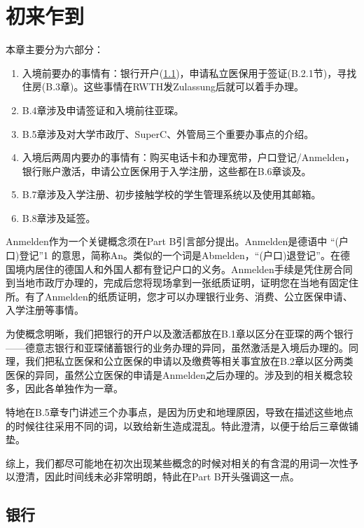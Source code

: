 
\chapter{初来乍到}\label{chap:初来乍到}

  本章主要分为六部分：

  \begin{enumerate}
    \item 入境前要办的事情有：银行开户(\ref{sec:银行})，申请私立医保用于签证(B.2.1节)，寻找住房(B.3章)。这些事情在RWTH发Zulassung后就可以着手办理。
    \item B.4章涉及申请签证和入境前往亚琛。
    \item B.5章涉及对大学市政厅、SuperC、外管局三个重要办事点的介绍。
    \item 入境后两周内要办的事情有：购买电话卡和办理宽带，户口登记/Anmelden，银行账户激活，申请公立医保用于入学注册，这些都在B.6章谈及。
    \item B.7章涉及入学注册、初步接触学校的学生管理系统以及使用其邮箱。
    \item B.8章涉及延签。
  \end{enumerate}
  
  Anmelden作为一个关键概念须在Part B引言部分提出。Anmelden是德语中 “(户口)登记”1 的意思，简称An。类似的一个词是Abmelden，“(户口)退登记”。在德国境内居住的德国人和外国人都有登记户口的义务。Anmelden手续是凭住房合同到当地市政厅办理的，完成后您将现场拿到一张纸质证明，证明您在当地有固定住所。有了Anmelden的纸质证明，您才可以办理银行业务、消费、公立医保申请、入学注册等事情。

  为使概念明晰，我们把银行的开户以及激活都放在B.1章以区分在亚琛的两个银行——德意志银行和亚琛储蓄银行的业务办理的异同，虽然激活是入境后办理的。同理，我们把私立医保和公立医保的申请以及缴费等相关事宜放在B.2章以区分两类医保的异同，虽然公立医保的申请是Anmelden之后办理的。涉及到的相关概念较多，因此各单独作为一章。

  特地在B.5章专门讲述三个办事点，是因为历史和地理原因，导致在描述这些地点的时候往往采用不同的词，以致给新生造成混乱。特此澄清，以便于给后三章做铺垫。

  综上，我们都尽可能地在初次出现某些概念的时候对相关的有含混的用词一次性予以澄清，因此时间线未必非常明朗，特此在Part B开头强调这一点。

\section{银行}\label{sec:银行}

